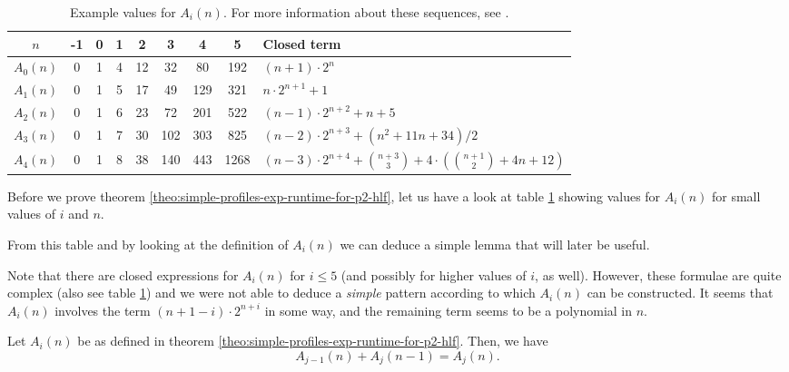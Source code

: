 \begin{table}
  \centering
  \begin{tabular}[ht]{ccccccccl}
    $n$ & -1 & 0 & 1 & 2 & 3 & 4 & 5 & Closed term \\
    \hline
    $A_0(n)$ & 0 & 1 & 4 & 12 & 32 & 80 & 192 & 
    $(n+1)\cdot 2^{n}$ \\
    $A_1(n)$ & 0 & 1 & 5 & 17 & 49 & 129 & 321 & 
    $n\cdot 2^{n+1} + 1$ \\
    $A_2(n)$ & 0 & 1 & 6 & 23 & 72 & 201& 522 & 
    $(n-1)\cdot 2^{n+2}+n+5$ \\
    $A_3(n)$ & 0 & 1 & 7 & 30 & 102 & 303 & 825 & 
    $(n-2)\cdot 2^{n+3}+(n^2+11 n+34)/2$ \\
    $A_4(n)$ & 0 & 1 & 8 & 38 & 140 & 443 & 1268 &
    $(n-3)\cdot2^{n+4}+\binom{n+3}{3}+4\cdot\left(\binom{n+1}{2}+4 n+12\right)$ \\
  \end{tabular}
  \caption{Example values for $A_i(n)$. For more information about these sequences, see \cite{oeistwoprocsA0}\cite{oeistwoprocsA1,oeistwoprocsA2,oeistwoprocsA3,oeistwoprocsA4}.}
  \label{tab:example-values-an-p2-profile}
\end{table}

Before we prove theorem \ref{theo:simple-profiles-exp-runtime-for-p2-hlf}, let us have a look at table \ref{tab:example-values-an-p2-profile} showing values for $A_i(n)$ for small values of $i$ and $n$.

From this table and by looking at the definition of $A_i(n)$ we can deduce a simple lemma that will later be useful.

Note that there are closed expressions for $A_i(n)$ for $i\leq 5$ (and possibly for higher values of $i$, as well). However, these formulae are quite complex (also see table \ref{tab:example-values-an-p2-profile}) and we were not able to deduce a \emph{simple} pattern according to which $A_i(n)$ can be constructed. It seems that $A_i(n)$ involves the term $(n+1-i)\cdot 2^{n+i}$ in some way, and the remaining term seems to be a polynomial in $n$.

\begin{lemma}
  \label{lemma:p2-hlf-profiles-an-simple-recurrence}
  Let $A_i(n)$ be as defined in theorem \ref{theo:simple-profiles-exp-runtime-for-p2-hlf}. Then, we have
  \begin{equation*}
    A_{j-1}(n) + A_{j}(n-1) = A_{j}(n).
  \end{equation*}
\end{lemma}

